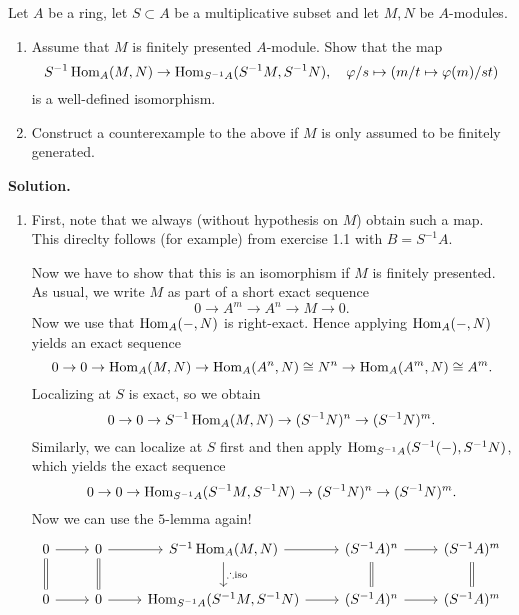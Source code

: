 \documentclass[a4paper,11pt]{article}
\begin{document}
Let $A$ be a ring, let $S \subset A$ be a multiplicative subset and let 
$M,N$ be $A$-modules.
\begin{enumerate}
    \item Assume that $M$ is finitely presented $A$-module. Show that the
        map 
        \begin{equation*}
            S^{-1} \operatorname{Hom}_A(M,N) \to \operatorname{Hom}_{S^{-1}A}(S^{-1}M, S^{-1}N), \quad
            \varphi/s \mapsto (m/t \mapsto \varphi(m)/st)
        \end{equation*}
        is a well-defined isomorphism.
    \item Construct a counterexample to the above if $M$ is only assumed
        to be finitely generated.
\end{enumerate}
\textbf{Solution.}
\begin{enumerate}
    \item First, note that we always (without hypothesis on $M$) obtain such a
        map. This direclty follows (for example) from exercise 1.1 with $B = S^{-1}A$.

        Now we have to show that this is an isomorphism if $M$ is finitely presented.
        As usual, we write $M$ as part of a short exact sequence
        \begin{equation*}
            0 \to A^m \to A^n \to M \to 0.
        \end{equation*}
    Now we use that $\operatorname{Hom}_A(-,N)$ is right-exact. Hence applying $\operatorname{Hom}_A(-,N)$ yields
    an exact sequence
    \begin{equation*}
        0 \to 0 \to \operatorname{Hom}_A(M, N) \to \operatorname{Hom}_A(A^n,N) \cong N^n \to \operatorname{Hom}_A(A^m,N) \cong A^m.
    \end{equation*}
    Localizing at $S$ is exact, so we obtain
    \begin{equation*}
        0 \to 0 \to S^{-1}\operatorname{Hom}_A(M, N) \to (S^{-1}N)^n \to (S^{-1}N)^m.
    \end{equation*}   
    Similarly, we can localize at $S$ first and then apply
    $\operatorname{Hom}_{S^{-1}A}(S^{-1}(-), S^{-1}N)$, which yields the exact sequence
    \begin{equation*}
        0 \to 0 \to \operatorname{Hom}_{S^{-1}A}(S^{-1}M, S^{-1}N) \to (S^{-1}N)^n \to
        (S^{-1}N)^m.
    \end{equation*}
    Now we can use the $5$-lemma again!
\[\begin{tikzcd}[ampersand replacement=\&]
	0 \& 0 \& {S^{-1}\Hom_A(M,N)} \& {(S^{-1}A)^n} \& {(S^{-1}A)^m} \\
	0 \& 0 \& {\Hom_{S^{-1}A}(S^{-1}M, S^{-1}N)} \& {(S^{-1}A)^n} \& {(S^{-1}A)^m}
	\arrow[Rightarrow, no head, from=1-1, to=2-1]
	\arrow[Rightarrow, no head, from=1-2, to=2-2]
	\arrow[Rightarrow, no head, from=1-4, to=2-4]
	\arrow[Rightarrow, no head, from=1-5, to=2-5]
	\arrow["{\therefore \text{iso}}", from=1-3, to=2-3]
	\arrow[from=1-2, to=1-3]
	\arrow[from=1-1, to=1-2]
	\arrow[from=2-1, to=2-2]
	\arrow[from=2-2, to=2-3]
	\arrow[from=2-3, to=2-4]
	\arrow[from=2-4, to=2-5]
	\arrow[from=1-3, to=1-4]
	\arrow[from=1-4, to=1-5]
\end{tikzcd}\]


\end{enumerate}
\end{document}
